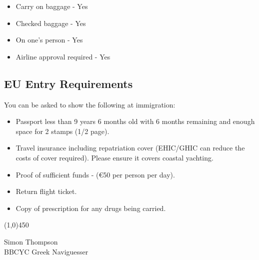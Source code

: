 \documentclass[12pt,a4paper,oneside]{article}
\begin{document}
\begin{multicols}{2}
\begin{itemize}
\item Carry on baggage - Yes
\item Checked baggage - Yes
\item On one's person - Yes
\item Airline approval required - Yes
\end{itemize}

\subsection*{EU Entry Requirements}
You can be asked to show the following at immigration:
\begin{itemize}
\item Passport less than 9 years 6 months old with 6 months remaining and enough space for 2 stamps (1/2 page).
\item Travel insurance including repatriation cover (EHIC/GHIC can reduce the costs of cover required).  Please ensure it covers coastal yachting. 
\item Proof of sufficient funds - (\euro{}50 per person per day).
\item Return flight ticket.
\item Copy of prescription for any drugs being carried.
\end{itemize}


\end{multicols}

\begin{center}
\line(1,0){450}
\end{center}

\noindent Simon Thompson\\
BBCYC Greek Naviguesser
\end{document}

